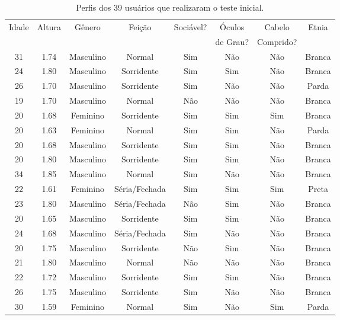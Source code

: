 \begin{table}[!ht]
	\caption{Perfis dos 39 usuários que realizaram o teste inicial.}
	\label{tab:perfilamostra}
	\centering
	\begin{tabular}{c | c | c | c | c | c | c | c}
        \hline
        Idade & Altura & Gênero & Feição & Sociável? & Óculos & Cabelo & Etnia \\
         &  &  &  &  & de Grau? & Comprido? &  \\ \hline
        31 & 1.74 & Masculino & Normal & Sim & Não & Não & Branca \\ \hline
        24 & 1.80 & Masculino & Sorridente & Sim & Sim & Não & Branca \\ \hline
        26 & 1.70 & Masculino & Sorridente & Sim & Não & Não & Parda \\ \hline
        19 & 1.70 & Masculino & Normal & Não & Não & Não & Branca \\ \hline
        20 & 1.68 & Feminino  & Sorridente & Sim & Sim & Sim & Branca \\ \hline
        20 & 1.63 & Feminino  & Normal & Sim & Sim & Não & Parda \\ \hline
        20 & 1.68 & Masculino & Sorridente & Sim & Sim & Não & Branca \\ \hline
        20 & 1.80 & Masculino & Sorridente & Sim & Sim & Não & Branca \\ \hline
        34 & 1.85 & Masculino & Normal & Sim & Não & Não & Branca \\ \hline
        22 & 1.61 & Feminino  & Séria/Fechada & Sim & Sim & Sim & Preta \\ \hline
        23 & 1.80 & Masculino & Séria/Fechada & Não & Sim & Não & Branca \\ \hline
        20 & 1.65 & Masculino & Sorridente & Sim & Sim & Não & Branca \\ \hline
        24 & 1.68 & Masculino & Séria/Fechada & Sim & Não & Não & Branca \\ \hline
        20 & 1.75 & Masculino & Sorridente & Não & Sim & Não & Branca \\ \hline
        21 & 1.80 & Masculino & Normal & Não & Não & Não & Branca \\ \hline
        22 & 1.72 & Masculino & Sorridente & Sim & Sim & Não & Branca \\ \hline
        26 & 1.75 & Masculino & Sorridente & Sim & Não & Não & Branca \\ \hline
        30 & 1.59 & Feminino  & Normal & Sim & Não & Sim & Parda \\ \hline

\end{tabular}
\end{table}
